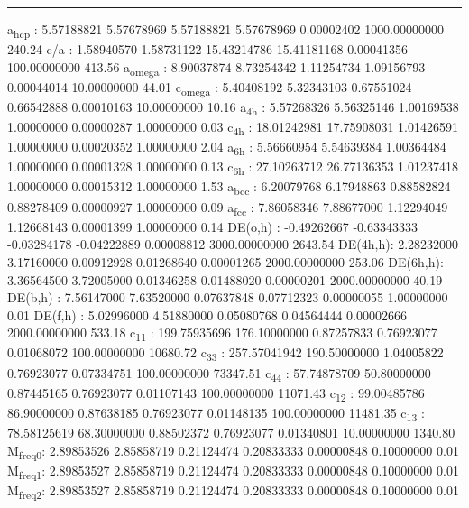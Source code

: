 \documentclass[11pt]{article}
\begin{document}
\noindent\rule{\textwidth}{0.5pt}
a\textsubscript{hcp}   :   5.57188821   5.57678969   5.57188821   5.57678969   0.00002402 1000.00000000       240.24
c/a     :   1.58940570   1.58731122  15.43214786  15.41181168   0.00041356 100.00000000       413.56
a\textsubscript{omega} :   8.90037874   8.73254342   1.11254734   1.09156793   0.00044014  10.00000000        44.01
c\textsubscript{omega} :   5.40408192   5.32343103   0.67551024   0.66542888   0.00010163  10.00000000        10.16
a\textsubscript{4h}    :   5.57268326   5.56325146   1.00169538   1.00000000   0.00000287   1.00000000         0.03
c\textsubscript{4h}    :  18.01242981  17.75908031   1.01426591   1.00000000   0.00020352   1.00000000         2.04
a\textsubscript{6h}    :   5.56660954   5.54639384   1.00364484   1.00000000   0.00001328   1.00000000         0.13
c\textsubscript{6h}    :  27.10263712  26.77136353   1.01237418   1.00000000   0.00015312   1.00000000         1.53
a\textsubscript{bcc}   :   6.20079768   6.17948863   0.88582824   0.88278409   0.00000927   1.00000000         0.09
a\textsubscript{fcc}   :   7.86058346   7.88677000   1.12294049   1.12668143   0.00001399   1.00000000         0.14
DE(o,h) :  -0.49262667  -0.63343333  -0.03284178  -0.04222889   0.00008812 3000.00000000      2643.54
DE(4h,h):   2.28232000   3.17160000   0.00912928   0.01268640   0.00001265 2000.00000000       253.06
DE(6h,h):   3.36564500   3.72005000   0.01346258   0.01488020   0.00000201 2000.00000000        40.19
DE(b,h) :   7.56147000   7.63520000   0.07637848   0.07712323   0.00000055   1.00000000         0.01
DE(f,h) :   5.02996000   4.51880000   0.05080768   0.04564444   0.00002666 2000.00000000       533.18
c\textsubscript{11}    : 199.75935696 176.10000000   0.87257833   0.76923077   0.01068072 100.00000000     10680.72
c\textsubscript{33}    : 257.57041942 190.50000000   1.04005822   0.76923077   0.07334751 100.00000000     73347.51
c\textsubscript{44}    :  57.74878709  50.80000000   0.87445165   0.76923077   0.01107143 100.00000000     11071.43
c\textsubscript{12}    :  99.00485786  86.90000000   0.87638185   0.76923077   0.01148135 100.00000000     11481.35
c\textsubscript{13}    :  78.58125619  68.30000000   0.88502372   0.76923077   0.01340801  10.00000000      1340.80
M\textsubscript{freq}\textsubscript{0}:   2.89853526   2.85858719   0.21124474   0.20833333   0.00000848   0.10000000         0.01
M\textsubscript{freq}\textsubscript{1}:   2.89853527   2.85858719   0.21124474   0.20833333   0.00000848   0.10000000         0.01
M\textsubscript{freq}\textsubscript{2}:   2.89853527   2.85858719   0.21124474   0.20833333   0.00000848   0.10000000         0.01
\end{document}
